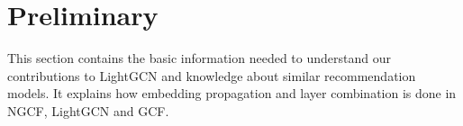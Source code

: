 \section{Preliminary}
This section contains the basic information needed to understand our contributions to LightGCN and knowledge about similar recommendation models.
It explains how embedding propagation and layer combination is done in NGCF, LightGCN and GCF.

